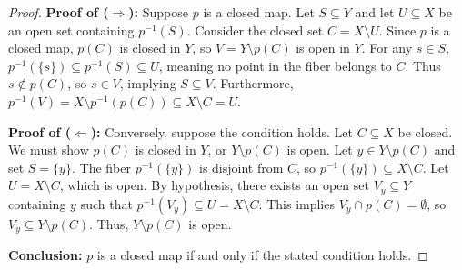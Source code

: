 
\begin{proof}
\textbf{Proof of ($\Rightarrow$):} Suppose $p$ is a closed map. Let $S\subseteq Y$ and let
$U\subseteq X$ be an open set containing $p^{-1}(S)$. Consider the closed set $C=X\setminus U$.
Since $p$ is a closed map, $p(C)$ is closed in $Y$, so $V=Y\setminus p(C)$ is open in $Y$. For
any $s\in S$, $p^{-1}(\{s\})\subseteq p^{-1}(S)\subseteq U$, meaning no point in the fiber
belongs to $C$. Thus $s\notin p(C)$, so $s\in V$, implying $S\subseteq V$. Furthermore,
$p^{-1}(V)=X\setminus p^{-1}(p(C))\subseteq X\setminus C=U$.

\textbf{Proof of ($\Leftarrow$):} Conversely, suppose the condition holds. Let $C\subseteq X$ be
closed. We must show $p(C)$ is closed in $Y$, or $Y\setminus p(C)$ is open. Let
$y\in Y\setminus p(C)$ and set $S=\{y\}$. The fiber $p^{-1}(\{y\})$ is disjoint from $C$, so
$p^{-1}(\{y\})\subseteq X\setminus C$. Let $U=X\setminus C$, which is open. By hypothesis, there
exists an open set $V_y\subseteq Y$ containing $y$ such that
$p^{-1}(V_y)\subseteq U=X\setminus C$. This implies $V_y\cap p(C)=\emptyset$, so
$V_y\subseteq Y\setminus p(C)$. Thus, $Y\setminus p(C)$ is open.

\textbf{Conclusion:} $p$ is a closed map if and only if the stated condition holds.
\end{proof}
